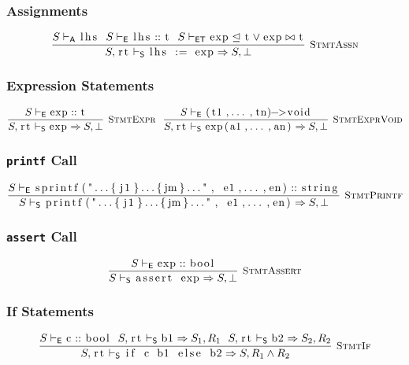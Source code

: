\documentclass{article}
\newcommand{\code}[1]{\lstinline[columns=fixed]{#1}}
\newcommand{\drmrule}[5]{\frac{#1}{#2\vdash_{\mathsf{#3}}#4}\textsc{\ \small{#5}}}
\newcommand{\ruleapp}[1]{\vdash_{\mathsf{#1}}}
\newcommand{\mc}[1]{\textnormal{\code{#1}}}
\begin{document}
			\subsubsection{Assignments}
			
				\begin{align*}
					\drmrule{S\ruleapp{A}\mc{lhs}\ \ S\ruleapp{E}\mc{lhs} :: \mc{t}\ \ S\ruleapp{ET}\mc{exp} \trianglelefteq \mc{t} \vee \mc{exp}\bowtie\mc{t}}{S,\mc{rt}}{S}{\mc{lhs := exp} \Rightarrow S,\bot}{StmtAssn}
				\end{align*}
			
			\subsubsection{Expression Statements}
			
				\begin{align*}
					\drmrule{S\ruleapp{E}\mc{exp} :: \mc{t}}{S,\mc{rt}}{S}{\mc{exp} \Rightarrow S,\bot}{StmtExpr}\ \ \drmrule{S\ruleapp{E}\mc{(t1,...,tn)->void}}{S,\mc{rt}}{S}{\mc{exp(a1,...,an)} \Rightarrow S,\bot}{StmtExprVoid}
				\end{align*}
				
			\subsubsection{\code{printf} Call}
			
				\begin{align*}
					\drmrule{S\ruleapp{E}\mc{sprintf("...\{j1\}...\{jm\}...", e1,...,en)}::\mc{string}}{S}{S}{\mc{printf("...\{j1\}...\{jm\}...", e1,...,en)} \Rightarrow S,\bot}{StmtPrintf}
				\end{align*}
				
			\subsubsection{\code{assert} Call}
			
				\begin{align*}
					\drmrule{S\ruleapp{E}\mc{exp}::\mc{bool}}{S}{S}{\mc{assert exp}\Rightarrow S,\bot}{StmtAssert}
				\end{align*}
			
			\subsubsection{If Statements}
			
				\begin{align*}
					\drmrule{S\ruleapp{E}\mc{c} :: \mc{bool}\ \ S,\mc{rt}\ruleapp{S}\mc{b1}\Rightarrow S_1,R_1\ \ S,\mc{rt}\ruleapp{S}\mc{b2}\Rightarrow S_2,R_2}{S,\mc{rt}}{S}{\mc{if c b1 else b2} \Rightarrow S,R_1\wedge R_2}{StmtIf}
				\end{align*}
				
\end{document}
